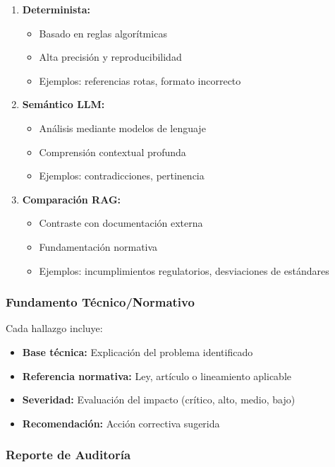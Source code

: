 \documentclass[12pt,a4paper]{article}
\begin{document}
\begin{enumerate}[leftmargin=*]
    \item \textbf{Determinista:}
    \begin{itemize}
        \item Basado en reglas algorítmicas
        \item Alta precisión y reproducibilidad
        \item Ejemplos: referencias rotas, formato incorrecto
    \end{itemize}
    
    \item \textbf{Semántico LLM:}
    \begin{itemize}
        \item Análisis mediante modelos de lenguaje
        \item Comprensión contextual profunda
        \item Ejemplos: contradicciones, pertinencia
    \end{itemize}
    
    \item \textbf{Comparación RAG:}
    \begin{itemize}
        \item Contraste con documentación externa
        \item Fundamentación normativa
        \item Ejemplos: incumplimientos regulatorios, desviaciones de estándares
    \end{itemize}
\end{enumerate}

\subsubsection{Fundamento Técnico/Normativo}

Cada hallazgo incluye:

\begin{itemize}[leftmargin=*]
    \item \textbf{Base técnica:} Explicación del problema identificado
    \item \textbf{Referencia normativa:} Ley, artículo o lineamiento aplicable
    \item \textbf{Severidad:} Evaluación del impacto (crítico, alto, medio, bajo)
    \item \textbf{Recomendación:} Acción correctiva sugerida
\end{itemize}

\subsubsection{Reporte de Auditoría}
\end{document}
